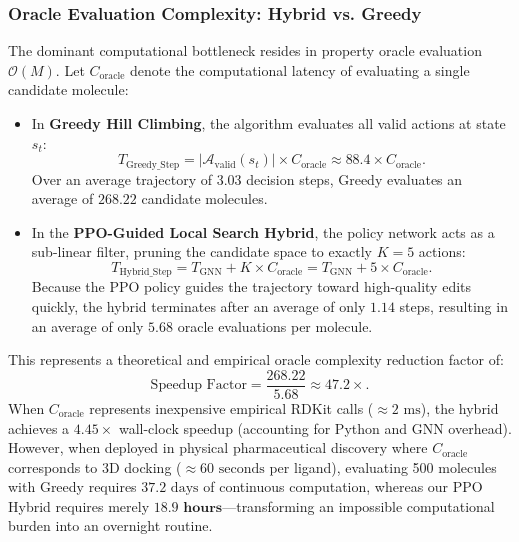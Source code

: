 \documentclass{ieeeaccess}
\begin{document}
\subsubsection{Oracle Evaluation Complexity: Hybrid vs. Greedy}
The dominant computational bottleneck resides in property oracle evaluation $\mathcal{O}(M)$. Let $C_{\text{oracle}}$ denote the computational latency of evaluating a single candidate molecule:
\begin{itemize}
    \item In \textbf{Greedy Hill Climbing}, the algorithm evaluates all valid actions at state $s_t$:
    \begin{equation}
    T_{\text{Greedy\_Step}} = |\mathcal{A}_{\text{valid}}(s_t)| \times C_{\text{oracle}} \approx 88.4 \times C_{\text{oracle}}.
    \end{equation}
    Over an average trajectory of 3.03 decision steps, Greedy evaluates an average of $268.22$ candidate molecules.
    \item In the \textbf{PPO-Guided Local Search Hybrid}, the policy network acts as a sub-linear filter, pruning the candidate space to exactly $K=5$ actions:
    \begin{equation}
    T_{\text{Hybrid\_Step}} = T_{\text{GNN}} + K \times C_{\text{oracle}} = T_{\text{GNN}} + 5 \times C_{\text{oracle}}.
    \end{equation}
    Because the PPO policy guides the trajectory toward high-quality edits quickly, the hybrid terminates after an average of only $1.14$ steps, resulting in an average of only $\mathbf{5.68}$ oracle evaluations per molecule.
\end{itemize}
This represents a theoretical and empirical oracle complexity reduction factor of:
\begin{equation}
\text{Speedup Factor} = \frac{268.22}{5.68} \approx \mathbf{47.2\times}.
\label{eq:speedup_factor}
\end{equation}
When $C_{\text{oracle}}$ represents inexpensive empirical RDKit calls ($\approx 2\text{ ms}$), the hybrid achieves a $4.45\times$ wall-clock speedup (accounting for Python and GNN overhead). However, when deployed in physical pharmaceutical discovery where $C_{\text{oracle}}$ corresponds to 3D docking ($\approx 60\text{ seconds}$ per ligand), evaluating 500 molecules with Greedy requires $37.2\text{ days}$ of continuous computation, whereas our PPO Hybrid requires merely $\mathbf{18.9\text{ hours}}$---transforming an impossible computational burden into an overnight routine.
\end{document}
